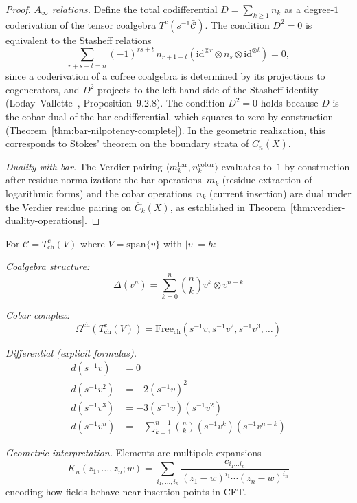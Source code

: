 \begin{proof}
\emph{$A_\infty$ relations.}
Define the total codifferential $D = \sum_{k \geq 1} n_k$ as a
degree-$1$ coderivation of the tensor coalgebra
$T^c(s^{-1}\bar{\mathcal{C}})$. The condition $D^2 = 0$ is equivalent
to the Stasheff relations
\[
\sum_{r+s+t=n} (-1)^{rs+t}\, n_{r+1+t}(\mathrm{id}^{\otimes r}
\otimes n_s \otimes \mathrm{id}^{\otimes t}) = 0,
\]
since a coderivation
of a cofree coalgebra is determined by its projections to cogenerators,
and $D^2$ projects to the left-hand side of the Stasheff identity
(Loday--Vallette~\cite{LV12}, Proposition~9.2.8). The condition $D^2 = 0$
holds because $D$ is the cobar dual of the bar codifferential, which
squares to zero by construction
(Theorem~\ref{thm:bar-nilpotency-complete}). In the geometric
realization, this corresponds to Stokes' theorem on the boundary
strata of $\overline{C}_n(X)$.

\emph{Duality with bar.}
The Verdier pairing $\langle m_k^{\mathrm{bar}}, n_k^{\mathrm{cobar}} \rangle$ evaluates to~$1$ by construction after residue normalization: the bar operations~$m_k$ (residue extraction of logarithmic forms) and the cobar operations~$n_k$ (current insertion) are dual under the Verdier residue pairing on $\overline{C}_k(X)$, as established in Theorem~\ref{thm:verdier-duality-operations}.
\end{proof}

\begin{example}
For $\mathcal{C} = T^c_{\text{ch}}(V)$ where $V = \text{span}\{v\}$ with $|v| = h$:

\emph{Coalgebra structure:}
\[\Delta(v^n) = \sum_{k=0}^n \binom{n}{k} v^k \otimes v^{n-k}\]

\emph{Cobar complex:}
\[\Omega^{\text{ch}}(T^c_{\text{ch}}(V)) = \text{Free}_{\text{ch}}(s^{-1}v, s^{-1}v^2, s^{-1}v^3, \ldots)\]

\emph{Differential (explicit formulas).}
\begin{align}
d(s^{-1}v) &= 0 \\
d(s^{-1}v^2) &= -2(s^{-1}v)^2 \\
d(s^{-1}v^3) &= -3(s^{-1}v)(s^{-1}v^2) \\
d(s^{-1}v^n) &= -\sum_{k=1}^{n-1} \binom{n}{k}(s^{-1}v^k)(s^{-1}v^{n-k})
\end{align}

\emph{Geometric interpretation.} Elements are multipole expansions
\[K_n(z_1, \ldots, z_n; w) = \sum_{i_1, \ldots, i_n} \frac{c_{i_1\ldots i_n}}{(z_1 - w)^{i_1} \cdots (z_n - w)^{i_n}}\]
encoding how fields behave near insertion points in CFT.
\end{example}

